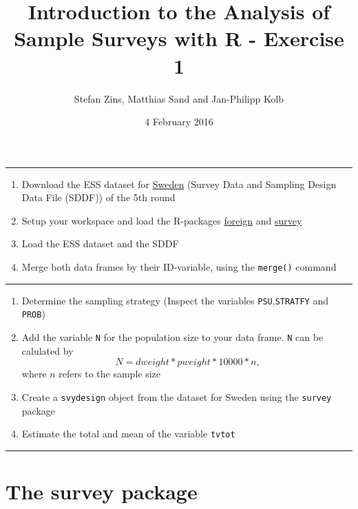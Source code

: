 \documentclass[]{article}
\title{Introduction to the Analysis of Sample Surveys with R - Exercise 1}
\author{Stefan Zins, Matthias Sand and Jan-Philipp Kolb}
\date{4 February 2016}
\begin{document}
\maketitle


\begin{center}\rule{0.5\linewidth}{\linethickness}\end{center}

\begin{enumerate}
\def\labelenumi{\arabic{enumi}.}
\itemsep1pt\parskip0pt
\item
  Download the ESS dataset for
  \href{http://www.europeansocialsurvey.org/data/country.html?c=sweden}{Sweden}
  (Survey Data and Sampling Design Data File (SDDF)) of the 5th round
\item
  Setup your workspace and load the R-packages
  \href{https://cran.r-project.org/web/packages/foreign/foreign.pdf}{foreign}
  and
  \href{https://cran.r-project.org/web/packages/survey/index.html}{survey}
\item
  Load the ESS dataset and the SDDF
\item
  Merge both data frames by their ID-variable, using the
  \texttt{merge()} command
\end{enumerate}

\begin{center}\rule{0.5\linewidth}{\linethickness}\end{center}

\begin{enumerate}
\def\labelenumi{\arabic{enumi}.}
\setcounter{enumi}{4}
\itemsep1pt\parskip0pt
\item
  Determine the sampling strategy (Inspect the variables
  \texttt{PSU},\texttt{STRATFY} and \texttt{PROB})
\item
  Add the variable \texttt{N} for the population size to your data
  frame. \texttt{N} can be calulated by
  \[N= dweight* pweight *10000*n \text{,}\] where \(n\) refers to the
  sample size
\item
  Create a \texttt{svydesign} object from the dataset for Sweden using
  the \texttt{survey} package
\item
  Estimate the total and mean of the variable \texttt{tvtot}
\end{enumerate}

\begin{center}\rule{0.5\linewidth}{\linethickness}\end{center}

\section{The survey package}\label{the-survey-package}
\end{document}
